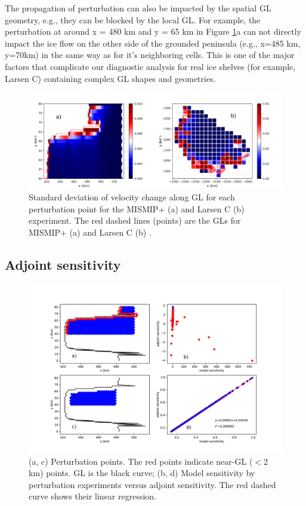 \documentclass[review,oneside]{igs}
\begin{document}
The propagation of perturbation can also be impacted by the spatial GL geometry, e.g., they can be blocked by the local GL. For example, the perturbation at around x = 480 km and y = 65 km in Figure \ref{fig8}a can not directly impact the ice flow on the other side of the grounded peninsula (e.g., x=485 km, y=70km) in the same way as for it's neighboring cells. This is one of the major factors that complicate our diagnostic analysis for real ice shelves (for example, Larsen C) containing complex GL shapes and geometries.
 
\begin{figure}
	\centering
    \includegraphics[width=1\linewidth]{figs/fig8.pdf}
    \caption{Standard deviation of velocity change along GL for each perturbation point for the MISMIP+ (a) and Larsen C (b) experiment. The red dashed lines (points) are the GLs for MISMIP+ (a) and Larsen C (b) .}
	\label{fig8}
\end{figure}

\subsection{Adjoint sensitivity}

\begin{figure}
	\centering
    \includegraphics[width=1\linewidth]{figs/fig9.pdf}
    \caption{(a, c) Perturbation points. The red points indicate near-GL ($<$2 km) points. GL is the black curve; (b, d) Model sensitivity by perturbation experiments versus adjoint sensitivity. The red dashed curve shows their linear regression.}
	\label{fig9}
\end{figure}
\end{document}
